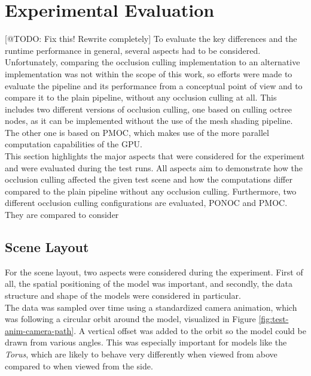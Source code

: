 \section{Experimental Evaluation} \label{sec-experimental-evaluation}

[@TODO: Fix this! Rewrite completely]
To evaluate the key differences and the runtime performance in general, several aspects had to be considered.
Unfortunately, comparing the occlusion culling implementation to an alternative implementation was not within the 
scope of this work, so efforts were made to evaluate the pipeline and its performance from a conceptual point of 
view and to compare it to the plain pipeline, without any occlusion culling at all. This includes two different 
versions of occlusion culling, one based on culling octree nodes, as it can be implemented without the use of the 
mesh shading pipeline. The other one is based on \ac{PMOC}, which makes use of the more parallel 
computation capabilities of the \ac{GPU}. \\

This section highlights the major aspects that were considered for the experiment and were evaluated during the 
test runs. All aspects aim to demonstrate how the occlusion culling affected the given test scene and how the 
computations differ compared to the plain pipeline without any occlusion culling. Furthermore, two different 
occlusion culling configurations are evaluated, \ac{PONOC} and \ac{PMOC}. They are compared to consider 


\subsection*{Scene Layout} \label{subsec-scene-layout}

For the scene layout, two aspects were considered during the experiment. First of all, the spatial positioning 
of the model was important, and secondly, the data structure and shape of the models were considered in particular. \\

\noindent
The data was sampled over time using a standardized camera animation, which was following a circular orbit 
around the model, visualized in Figure \ref{fig:test-anim-camera-path}. A vertical offset was added to the orbit 
so the model could be drawn from various angles. This was especially important for models like the \emph{Torus}, 
which are likely to behave very differently when viewed from above compared to when viewed from the side.

